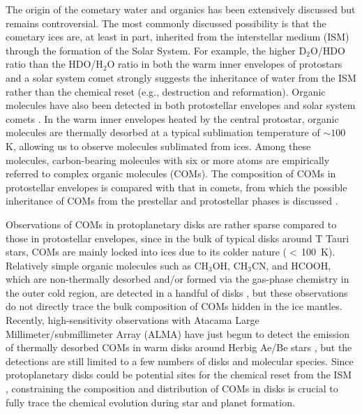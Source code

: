 \documentclass[linenumbers, twocolumn, twocolappendix, astrosymb, times]{aastex631}
\newcommand{\methanol}{CH$_3$OH\xspace}
\begin{document}
The origin of the cometary water and organics has been extensively discussed but remains controversial. The most commonly discussed possibility is that the cometary ices are, at least in part, inherited from the interstellar medium (ISM) through the formation of the Solar System. 
For example, the higher D$_2$O/HDO ratio than the HDO/H$_2$O ratio in both the warm inner envelopes of protostars \citep{Coutens2014, Jensen2021} and a solar system comet \citep{Altwegg2017}
strongly suggests the inheritance of water from the ISM rather than the chemical reset (e.g., destruction and reformation).
Organic molecules have also been detected in both protostellar envelopes and solar system comets \citep[e.g.,][]{Jorgensen2016, Rubin2019}. In the warm inner envelopes heated by the central protostar, organic molecules are thermally desorbed at a typical sublimation temperature of $\sim100$\,K, allowing us to observe molecules sublimated from ices. Among these molecules, carbon-bearing molecules with six or more atoms are empirically referred to complex organic molecules (COMs). The composition of COMs in protostellar envelopes is compared with that in comets, from which the possible inheritance of COMs from the prestellar and protostellar phases is discussed \citep[e.g.,][]{Drozdovskaya2019}.

Observations of COMs in protoplanetary disks are rather sparse compared to those in protostellar envelopes, since in the bulk of typical disks around T Tauri stars, COMs are mainly locked into ices due to its colder nature ($<$\,100~K).  Relatively simple organic molecules such as \methanol, CH$_3$CN, and HCOOH, which are non-thermally desorbed and/or formed via the gas-phase chemistry in the outer cold region, are detected in a handful of disks \citep{Walsh2016, Oberg2015, Bergner2018, Loomis2018, Ilee2021, Favre2018}, but these observations do not directly trace the bulk composition of COMs hidden in the ice mantles. Recently, high-sensitivity observations with Atacama Large Millimeter/submillimeter Array (ALMA) have just begun to detect the emission of thermally desorbed COMs in warm disks around Herbig Ae/Be stars \citep{vanderMarel2021, Booth2021_CH3OH, Brunken2022, Booth2023_HD169142}, but the detections are still limited to a few numbers of disks and molecular species. Since protoplanetary disks could be potential sites for the chemical reset from the ISM \citep[e.g.,][]{Walsh2014, Furuya2014, Eistrup2016}, constraining the composition and distribution of COMs in disks is crucial to fully trace the chemical evolution during star and planet formation.
\end{document}
